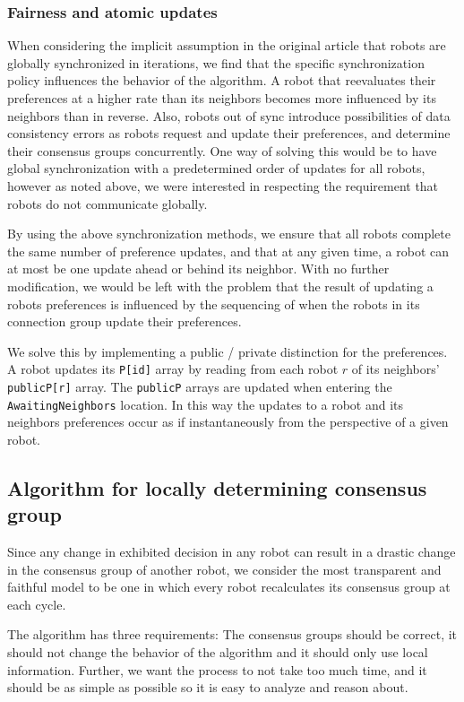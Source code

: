 \subsubsection{Fairness and atomic updates}

When considering the implicit assumption in the original article that robots are globally synchronized in iterations, we find that the specific synchronization policy influences the behavior of the algorithm.
A robot that reevaluates their preferences at a higher rate than its neighbors becomes more influenced by its neighbors than in reverse. Also, robots out of sync introduce possibilities of data consistency errors as robots request and update their preferences, and determine their consensus groups concurrently.
One way of solving this would be to have global synchronization with a predetermined order of updates for all robots, however as noted above, we were interested in respecting the requirement that robots do not communicate globally.

By using the above synchronization methods, we ensure that all robots complete the same number of preference updates, and that at any given time, a robot can at most be one update ahead or behind its neighbor. With no further modification, we would be left with the problem that the result of updating a robots preferences is influenced by the sequencing of when the robots in its connection group update their preferences.

We solve this by implementing a public / private distinction for the preferences. A robot updates its \texttt{P[id]} array by reading from each robot $r$ of its neighbors'  \texttt{publicP[r]} array. The  \texttt{publicP} arrays are updated when entering the \texttt{AwaitingNeighbors} location. In this way the updates to a robot and its neighbors preferences occur as if instantaneously from the perspective of a given robot.

\subsection{Algorithm for locally determining consensus group}

Since any change in exhibited decision in any robot can result in a drastic change in the consensus group of another robot, we consider the most transparent and faithful model to be one in which every robot recalculates its consensus group at each cycle.

The algorithm has three requirements: The consensus groups should be correct, it should not change the behavior of the algorithm and it should only use local information. Further, we want the process to not take too much time, and it should be as simple as possible so it is easy to analyze and reason about.

